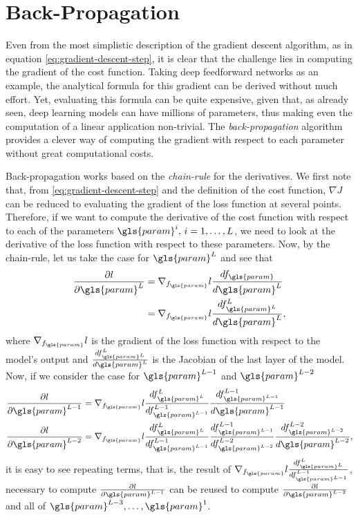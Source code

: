 \section{Back-Propagation}

Even from the most simplistic description of the gradient descent algorithm, as in equation \eqref{eq:gradient-descent-step}, it is clear that the challenge lies in computing the gradient of the cost function.
Taking deep feedforward networks as an example, the analytical formula for this gradient can be derived without much effort.
Yet, evaluating this formula can be quite expensive, given that, as already seen, deep learning models can have millions of parameters, thus making even the computation of a linear application non-trivial.
The \emph{back-propagation} algorithm \cite{rumelhart_learning_1986} provides a clever way of computing the gradient with respect to each parameter without great computational costs.

Back-propagation works based on the \emph{chain-rule} for the derivatives.
We first note that, from \eqref{eq:gradient-descent-step} and the definition of the cost function, $\nabla J$ can be reduced to evaluating the gradient of the loss function at several points.
Therefore, if we want to compute the derivative of the cost function with respect to each of the parameters $\gls{param}^i,\,i=1,\ldots,L$, we need to look at the derivative of the loss function with respect to these parameters.
Now, by the chain-rule, let us take the case for $\gls{param}^L$ and see that
 \begin{align*}
     \frac{\partial l}{\partial\gls{param}^L} &= \nabla_{f_{\gls{param}}} l \frac{d f_{\gls{param}}}{d \gls{param}^L} \\
     &= \nabla_{f_{\gls{param}}} l \frac{d f^L_{\gls{param}^L}}{d \gls{param}^L}
,\end{align*}
where $\nabla_{f_{\gls{param}}} l$ is the gradient of the loss function with respect to the model's output and $\frac{d f^L_{\gls{param}^L}}{d \gls{param}^L}$ is the Jacobian of the last layer of the model. Now, if we consider the case for $\gls{param}^{L-1}$ and $\gls{param}^{L-2}$
 \begin{align*}
     \frac{\partial l}{\partial\gls{param}^{L-1}} &= \nabla_{f_{\gls{param}}} l \frac{d f^L_{\gls{param}^L}}{d f^{L-1}_{\gls{param}^{L-1}}} \frac{d f^{L-1}_{\gls{param}^{L-1}}}{d \gls{param}^{L-1}} \\
     \frac{\partial l}{\partial\gls{param}^{L-2}} &= \nabla_{f_{\gls{param}}} l \frac{d f^L_{\gls{param}^L}}{d f^{L-1}_{\gls{param}^{L-1}}} \frac{d f^{L-1}_{\gls{param}^{L-1}}}{d f^{L-2}_{\gls{param}^{L-2}}} \frac{d f^{L-2}_{\gls{param}^{L-2}}}{d \gls{param}^{L-2}}
,\end{align*}
it is easy to see repeating terms, that is, the result of $\nabla_{f_{\gls{param}}} l \frac{d f^L_{\gls{param}^L}}{d f^{L-1}_{\gls{param}^{L-1}}}$, necessary to compute $\frac{\partial l}{\partial\gls{param}^{L-1}}$ can be reused to compute $\frac{\partial l}{\partial\gls{param}^{L-2}}$ and all of $\gls{param}^{L-3},\ldots,\gls{param}^1$.

